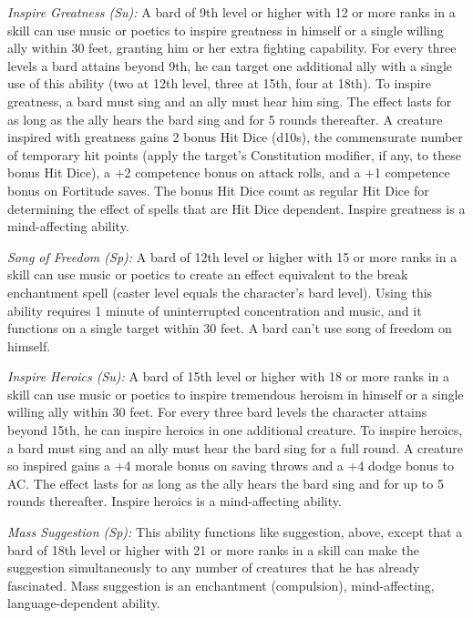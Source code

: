 \textit{Inspire Greatness (Su):} A bard of 9th level or higher with 12 or more ranks in a  skill can use music or poetics to inspire greatness in himself or a single willing ally within 30 feet, granting him or her extra fighting capability. For every three levels a bard attains beyond 9th, he can target one additional ally with a single use of this ability (two at 12th level, three at 15th, four at 18th). To inspire greatness, a bard must sing and an ally must hear him sing. The effect lasts for as long as the ally hears the bard sing and for 5 rounds thereafter. A creature inspired with greatness gains 2 bonus Hit Dice (d10s), the commensurate number of temporary hit points (apply the target's Constitution modifier, if any, to these bonus Hit Dice), a +2 competence bonus on attack rolls, and a +1 competence bonus on Fortitude saves. The bonus Hit Dice count as regular Hit Dice for determining the effect of spells that are Hit Dice dependent. Inspire greatness is a mind-affecting ability.

\textit{Song of Freedom (Sp):} A bard of 12th level or higher with 15 or more ranks in a  skill can use music or poetics to create an effect equivalent to the break enchantment spell (caster level equals the character's bard level). Using this ability requires 1 minute of uninterrupted concentration and music, and it functions on a single target within 30 feet. A bard can't use song of freedom on himself.

\textit{Inspire Heroics (Su):} A bard of 15th level or higher with 18 or more ranks in a  skill can use music or poetics to inspire tremendous heroism in himself or a single willing ally within 30 feet. For every three bard levels the character attains beyond 15th, he can inspire heroics in one additional creature. To inspire heroics, a bard must sing and an ally must hear the bard sing for a full round. A creature so inspired gains a +4 morale bonus on saving throws and a +4 dodge bonus to AC. The effect lasts for as long as the ally hears the bard sing and for up to 5 rounds thereafter. Inspire heroics is a mind-affecting ability.

\textit{Mass Suggestion (Sp):} This ability functions like suggestion, above, except that a bard of 18th level or higher with 21 or more ranks in a  skill can make the suggestion simultaneously to any number of creatures that he has already fascinated. Mass suggestion is an enchantment (compulsion), mind-affecting, language-dependent ability.

